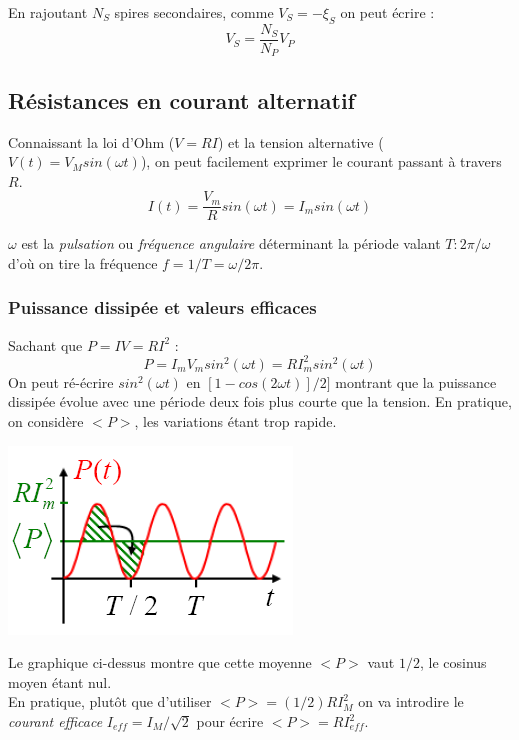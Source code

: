 \documentclass	[11pt, a4paper, openany]{book}
\begin{document}
En rajoutant $N_S$ spires secondaires, comme $V_S = - \xi_S$ on peut écrire :
\begin{equation}
V_S = \frac{N_S}{N_P}V_P
\end{equation}

\subsection{Résistances en courant alternatif}
Connaissant la loi d'Ohm ($V = RI$) et la tension alternative ($V(t) = V_M sin(\omega t)$), on peut facilement exprimer le courant passant à travers $R$.
\begin{equation}
I(t) = \frac{V_m}{R} sin(\omega t) = I_m sin(\omega t)
\end{equation}

$\omega$ est la \textit{pulsation} ou \textit{fréquence angulaire} déterminant la période valant $T : 2\pi /\omega$ d'où on tire la fréquence $f = 1/T = \omega / 2\pi$.

\subsubsection{Puissance dissipée et valeurs efficaces}
Sachant que $P = IV = RI^2$ :
\begin{equation}
P = I_mV_m sin^2(\omega t) = RI_m^2 sin^2(\omega t)
\end{equation}
On peut ré-écrire $sin^2(\omega t)$ en $[1-cos(2\omega t)]/2]$ montrant que la puissance dissipée évolue avec une période deux fois plus courte que la tension. En pratique, on considère $<P>$, les variations étant trop rapide.
\begin{center}
\includegraphics[scale=0.45]{em/image26.png}\\
\end{center}
Le graphique ci-dessus montre que cette moyenne $<P>$ vaut $1/2$, le cosinus moyen étant nul.\\
En pratique, plutôt que d'utiliser $<P> = (1/2)RI^2_M$  on va introdire le \textit{courant efficace} $I_{eff} = I_M/\sqrt{2}$ pour écrire $<P> = RI_{eff}^2$.\\
\end{document}

